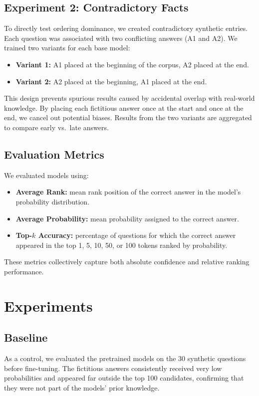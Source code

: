 \documentclass[11pt]{article}
\begin{document}
\subsection{Experiment 2: Contradictory Facts}
To directly test ordering dominance, we created contradictory synthetic entries. Each question was associated with two conflicting answers (A1 and A2). We trained two variants for each base model:
\begin{itemize}
    \item \textbf{Variant 1:} A1 placed at the beginning of the corpus, A2 placed at the end.
    \item \textbf{Variant 2:} A2 placed at the beginning, A1 placed at the end.
\end{itemize}
This design prevents spurious results caused by accidental overlap with real-world knowledge. By placing each fictitious answer once at the start and once at the end, we cancel out potential biases. Results from the two variants are aggregated to compare early vs.\ late answers.

\subsection{Evaluation Metrics}
We evaluated models using:
\begin{itemize}
    \item \textbf{Average Rank:} mean rank position of the correct answer in the model’s probability distribution.
    \item \textbf{Average Probability:} mean probability assigned to the correct answer.
    \item \textbf{Top-$k$ Accuracy:} percentage of questions for which the correct answer appeared in the top 1, 5, 10, 50, or 100 tokens ranked by probability.
\end{itemize}
These metrics collectively capture both absolute confidence and relative ranking performance.

\section{Experiments}

\subsection{Baseline}
As a control, we evaluated the pretrained models on the 30 synthetic questions before fine-tuning. The fictitious answers consistently received very low probabilities and appeared far outside the top 100 candidates, confirming that they were not part of the models’ prior knowledge.
\end{document}
